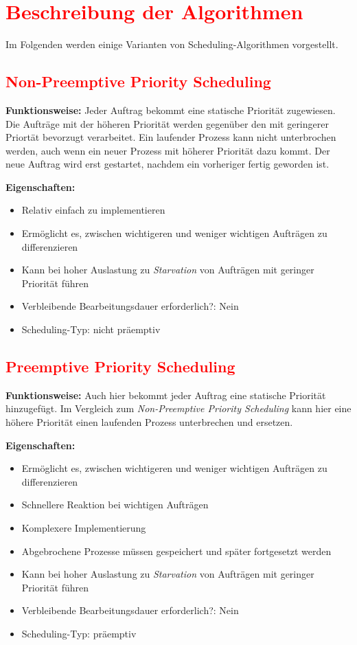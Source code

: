 \documentclass[
    12pt,               
    a4paper,            
    ngerman,            
    parskip=half,       
    headings=normal,   
    numbers=enddot,     
    toc=chapterentrywithdots 
]{scrreprt}\usepackage[utf8]{inputenc}
\begin{document}
\newpage
\section{\textcolor{red}{Beschreibung der Algorithmen}}
Im Folgenden werden einige Varianten von Scheduling-Algorithmen vorgestellt.

\subsection{\textcolor{red}{Non-Preemptive Priority Scheduling}}
\textbf{Funktionsweise:} Jeder Auftrag bekommt eine statische Priorität zugewiesen. Die Aufträge mit der höheren Priorität werden gegenüber den mit geringerer Priortät bevorzugt verarbeitet. Ein laufender Prozess kann nicht unterbrochen werden, auch wenn ein neuer Prozess mit höherer Priorität dazu kommt. Der neue Auftrag wird erst gestartet, nachdem ein vorheriger fertig geworden ist.\citep[Vgl.][S.153]{tanenbaum2015}

\textbf{Eigenschaften:}
\begin{itemize}
    \item[+] Relativ einfach zu implementieren
    \item[+] Ermöglicht es, zwischen wichtigeren und weniger wichtigen Aufträgen zu differenzieren
    \item[-] Kann bei hoher Auslastung zu \textit{Starvation} von Aufträgen mit geringer Priorität führen
    \item Verbleibende Bearbeitungsdauer erforderlich?: Nein
    \item Scheduling-Typ: nicht präemptiv
\end{itemize}

\subsection{\textcolor{red}{Preemptive Priority Scheduling}}
\textbf{Funktionsweise:} Auch hier bekommt jeder Auftrag eine statische Priorität hinzugefügt. Im Vergleich zum \textit{Non-Preemptive Priority Scheduling} kann hier eine höhere Priorität einen laufenden Prozess unterbrechen und ersetzen. \citep[Vgl.][S.153]{tanenbaum2015}

\textbf{Eigenschaften:}
\begin{itemize}
    \item[+] Ermöglicht es, zwischen wichtigeren und weniger wichtigen Aufträgen zu differenzieren
    \item[+] Schnellere Reaktion bei wichtigen Aufträgen
    \item[-] Komplexere Implementierung
    \item[-] Abgebrochene Prozesse müssen gespeichert und später fortgesetzt werden
    \item[-] Kann bei hoher Auslastung zu \textit{Starvation} von Aufträgen mit geringer Priorität führen
    \item Verbleibende Bearbeitungsdauer erforderlich?: Nein
    \item Scheduling-Typ: präemptiv
\end{itemize}
\end{document}
